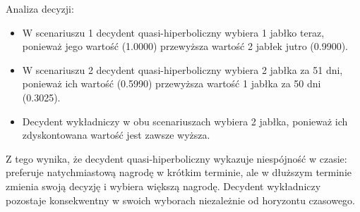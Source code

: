 Analiza decyzji:
\begin{itemize}
\item W scenariuszu 1 decydent quasi-hiperboliczny wybiera 1 jabłko teraz, ponieważ jego wartość (1.0000) przewyższa wartość 2 jabłek jutro (0.9900).
\item W scenariuszu 2 decydent quasi-hiperboliczny wybiera 2 jabłka za 51 dni, ponieważ ich wartość (0.5990) przewyższa wartość 1 jabłka za 50 dni (0.3025).
\item Decydent wykładniczy w obu scenariuszach wybiera 2 jabłka, ponieważ ich zdyskontowana wartość jest zawsze wyższa.
\end{itemize}
Z tego wynika, że decydent quasi-hiperboliczny wykazuje niespójność w czasie: preferuje natychmiastową nagrodę w krótkim terminie, ale w dłuższym terminie zmienia swoją decyzję i wybiera większą nagrodę. Decydent wykładniczy pozostaje konsekwentny w swoich wyborach niezależnie od horyzontu czasowego.

